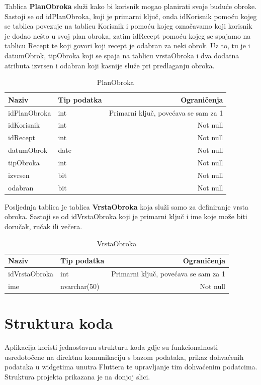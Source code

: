\documentclass[diplomskirad]{fer}
\begin{document}
Tablica \textbf{PlanObroka} služi kako bi korisnik mogao planirati svoje buduće obroke. Sastoji se od idPlanObroka, koji je primarni ključ, onda idKorisnik pomoću kojeg se tablica povezuje na tablicu Korisnik i pomoću kojeg označavamo koji korisnik je dodao nešto u svoj plan obroka, zatim idRecept pomoću kojeg se spajamo na tablicu Recept te koji govori koji recept je odabran za neki obrok. Uz to, tu je i datumObrok, tipObroka koji se spaja na tablicu vrstaObroka i dva dodatna atributa izvrsen i odabran koji kasnije služe pri predlaganju obroka. 

\begin{table}[H]
\label{tbl:PlanObroka}
\centering
\renewcommand{\arraystretch}{1.3}
\begin{tabular}{llr} \hline
Naziv & Tip podatka & Ograničenja\\ \hline
idPlanObroka & int & Primarni ključ, povećava se sam za 1 \\
idKorisnik & int & Not null\\
idRecept & int & Not null\\
datumObrok & date & Not null\\
tipObroka & int & Not null\\
izvrsen & bit & Not null\\
odabran & bit & Not null\\
\end{tabular}
\caption{PlanObroka}
\end{table}

Posljednja tablica je tablica \textbf{VrstaObroka} koja služi samo za definiranje vrsta obroka. Sastoji se od idVrstaObroka koji je primarni ključ i ime koje može biti doručak, ručak ili večera.

\begin{table}[H]
\label{tbl:VrstaObroka}
\centering
\renewcommand{\arraystretch}{1.3}
\begin{tabular}{llr} \hline
Naziv & Tip podatka & Ograničenja\\ \hline
idVrstaObroka & int & Primarni ključ, povećava se sam za 1 \\
ime & nvarchar(50) & Not null\\
\end{tabular}
\caption{VrstaObroka}
\end{table}

\section{Struktura koda}
Aplikacija koristi jednostavnu strukturu koda gdje su funkcionalnosti usredotočene na direktnu komunikaciju s bazom podataka, prikaz dohvaćenih podataka u widgetima unutra Fluttera te upravljanje tim dohvaćenim podatcima. Struktura projekta prikazana je na donjoj slici. 
\end{document}

